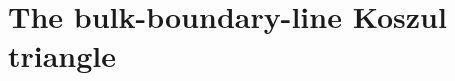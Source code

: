 
\providecommand{\kk}{\mathbb{k}}
\providecommand{\cO}{\mathcal O}
\providecommand{\SCop}{\mathsf{SC}^{\mathrm{ch,top}}}
\providecommand{\gSC}{\mathfrak{g}^{\mathrm{SC}}}
\providecommand{\cC}{\mathcal C}
\providecommand{\cL}{\mathcal L}
\providecommand{\cM}{\mathcal M}
\providecommand{\cJ}{\mathcal J}
\providecommand{\Ainf}{\mathsf{A}_{\infty}}
\providecommand{\Linf}{L_\infty}
\providecommand{\Sym}{\operatorname{Sym}}
\providecommand{\PV}{\operatorname{PV}}
\providecommand{\ot}{\otimes}
\providecommand{\CE}{\operatorname{CE}}
\providecommand{\HH}{\operatorname{HH}}
\providecommand{\RHom}{\operatorname{RHom}}
\providecommand{\BBar}{\operatorname{Bar}}
\providecommand{\Cobar}{\operatorname{\Omega}}
\providecommand{\Spec}{\operatorname{Spec}}
\providecommand{\Spf}{\operatorname{Spf}}

\providecommand{\End}{\operatorname{End}}
\providecommand{\Hom}{\operatorname{Hom}}
\providecommand{\Der}{\operatorname{Der}}
\providecommand{\gr}{\operatorname{gr}}
\providecommand{\im}{\operatorname{im}}
\providecommand{\coker}{\operatorname{coker}}
\providecommand{\id}{\operatorname{id}}
\providecommand{\Perf}{\operatorname{Perf}}
\providecommand{\Cl}{\operatorname{Cl}}
\providecommand{\dCrit}{\operatorname{dCrit}}
\providecommand{\Zder}{\operatorname{Z}_{\mathrm{der}}}
\providecommand{\mc}{\operatorname{MC}}
\providecommand{\op}{\mathrm{op}}
\providecommand{\der}{\mathrm{der}}
\providecommand{\Abulk}{A_{\mathrm{bulk}}}
\providecommand{\Bbound}{B_{\partial}}
\providecommand{\Kline}{K_{\mathrm{line}}}
\providecommand{\intr}{\mathrm{intr}}
\providecommand{\free}{\mathrm{free}}
\providecommand{\eff}{\mathrm{eff}}
\providecommand{\st}{\mathrm{st}}
\providecommand{\ex}{\mathrm{ex}}
\providecommand{\minmod}{\mathrm{min}}
\providecommand{\expmod}{\mathrm{exp}}
\providecommand{\hkR}{\mathrm{HKR}}
\providecommand{\sn}{\mathrm{SN}}
\providecommand{\lines}{\mathsf{Lines}}
\providecommand{\hSym}{\widehat{\Sym}}


\section{The bulk-boundary-line Koszul triangle}

